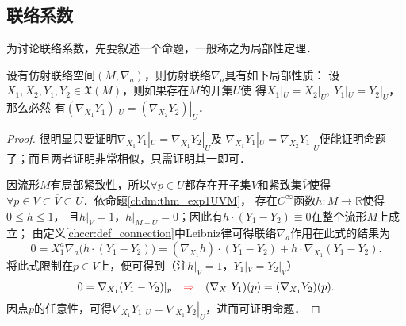 \subsection{联络系数}
为讨论联络系数，先要叙述一个命题，一般称之为{\heiti 局部性定理}．
\begin{proposition}\label{chccr:thm_local}
    设有仿射联络空间$(M,\nabla_a)$，则仿射联络$\nabla_a$具有如下{\kaishu 局部性质}：
    设$X_1,X_2,Y_1,Y_2\in \mathfrak{X}(M)$，则如果存在$M$的开集$U$使
    得$X_1|_U =X_2|_U,\ Y_1|_U =Y_2|_U  $，那么必然
    有$(\nabla_{X_1} Y_1) |_U=(\nabla_{X_2} Y_2) |_U$．
\end{proposition}
\begin{proof}
    很明显只要证明$\nabla_{X_1} Y_1 |_U=\nabla_{X_1} Y_2 |_U$及
    $\nabla_{X_1} Y_1 |_U=\nabla_{X_2} Y_1 |_U$便能证明命题了；而且两者证明非常相似，只需证明其一即可．

    因流形$M$有局部紧致性，所以$\forall p\in U$都存在开子集$V$和紧致集$\overline{V}$使得
    $\forall p \in V \subset \overline{V} \subset U$．依命题\ref{chdm:thm_exp1UVM}，
    存在$C^\infty$函数$h:M \to \mathbb{R}$使得$0\leqslant h \leqslant 1$，
    且$h|_V=1$，$h|_{M-U}=0$；因此有$h\cdot(Y_1-Y_2)\equiv 0$在整个流形$M$上成立；
    由定义\ref{chccr:def_connection}中Leibniz律可得联络$\nabla_a$作用在此式的结果为
    \begin{equation*}
        0=X_1^a \nabla_a \bigl( h\cdot(Y_1-Y_2) \bigr) = ( \nabla_{X_1}  h ) \cdot(Y_1-Y_2)
        +h\cdot \nabla_{X_1} (Y_1-Y_2) .
    \end{equation*}
    将此式限制在$p\in V$上，便可得到（注$h|_V=1$，$Y_1|_V =Y_2|_V$）
    \begin{equation*}
        0=\nabla_{X_1} (Y_1-Y_2)|_p 
        \quad {\color{red}\Rightarrow}\quad
        (\nabla_{X_1} Y_1) (p) = (\nabla_{X_1} Y_2) (p) .
    \end{equation*}
    因点$p$的任意性，可得$\nabla_{X_1} Y_1|_U = \nabla_{X_1} Y_2|_U$，进而可证明命题．
\end{proof}


